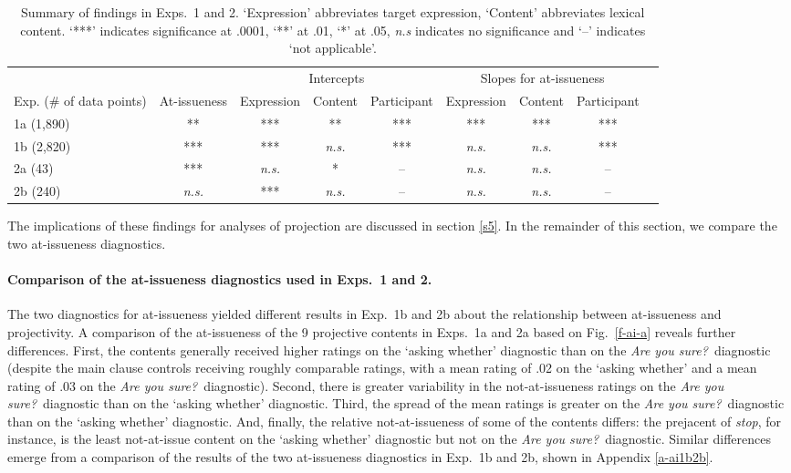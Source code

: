 \documentclass[11pt,fleqn]{article}
\newcommand{\6}{\mbox{$[\hspace*{-.6mm}[$}}
\newcommand{\9}{\mbox{$]\hspace*{-.6mm}]$}}
\newcommand{\figref}[1]{Fig.~\ref{#1}}
\begin{document}
\begin{table}[h!]

\begin{center}
\begin{tabular}{p{1.8cm} | c | c c c | c c c c}
\toprule
& & \multicolumn{3}{c|}{Intercepts} & \multicolumn{3}{c}{Slopes for at-issueness}\\
Exp. (\# of data points) & At-issueness & Expression & Content & Participant & Expression & Content & Participant\\
\midrule
1a (1,890) & ** & *** & ** & *** & *** & *** & ***  \\ 

1b (2,820) & *** & *** & \emph{n.s.} &  *** & \emph{n.s.} & \emph{n.s.} & *** \\ 

2a (43) & *** & \emph{n.s.} & * & -- & \emph{n.s.} & \emph{n.s.} & -- \\ 

2b (240) & \emph{n.s.} & *** & \emph{n.s.} & --& \emph{n.s.} & \emph{n.s.} & -- \\ 
\bottomrule
\end{tabular}
\end{center}
\caption{Summary of findings in Exps.~1 and 2. `Expression' abbreviates target expression, `Content' abbreviates lexical content. `***' indicates significance at .0001, `**' at .01, `*' at .05, \emph{n.s} indicates no significance and `--' indicates `not applicable'.}\label{t-summary}
\end{table}

The implications of these findings for analyses of projection are discussed in section \ref{s5}. In the remainder of this section, we compare the two at-issueness diagnostics. 

\paragraph{Comparison of the at-issueness diagnostics used in Exps.~1 and 2.} The two diagnostics for at-issueness yielded different results in Exp.~1b and 2b about the relationship between at-issueness and projectivity. A comparison of the at-issueness of the 9 projective contents in Exps.~1a and 2a based on \figref{f-ai-a} reveals further differences. First, the contents generally received higher ratings on the `asking whether' diagnostic than on the {\em Are you sure?}~diagnostic (despite the main clause controls receiving roughly comparable ratings, with a mean rating of .02 on the `asking whether' and a mean rating of .03 on the {\em Are you sure?}~diagnostic). Second, there is greater variability in the not-at-issueness ratings on the {\em Are you sure?}~diagnostic  than on the `asking whether' diagnostic. Third, the spread of the mean ratings is greater on the {\em Are you sure?}~diagnostic than on the `asking whether' diagnostic. And, finally, the relative not-at-issueness of some of the contents differs: the prejacent of {\em stop}, for instance, is the least not-at-issue content on the `asking whether' diagnostic but not on the {\em Are you sure?}~diagnostic. Similar differences emerge from a comparison of the results of the two at-issueness diagnostics in Exp.~1b and 2b, shown in Appendix \ref{a-ai1b2b}. 
\end{document}
